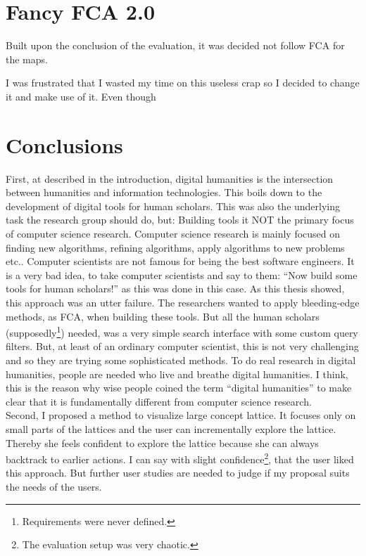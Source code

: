 \documentclass[11pt]{report}
\begin{document}
\chapter{Fancy FCA 2.0}
\label{Fancy 2.0}

Built upon the conclusion of the evaluation, it was decided not follow FCA for the maps. 

I was frustrated that I wasted my time on this useless crap so I decided to change it and make use of it. Even though

\chapter{Conclusions}
\label{Conclusions}

First, at described in the introduction, digital humanities is the intersection between humanities and information technologies. This boils down to the development of digital tools for human scholars. This was also the underlying task the research group should do, but: Building tools it NOT the primary focus of computer science research. Computer science research is mainly focused on finding new algorithms, refining algorithms, apply algorithms to new problems etc.. Computer scientists are not famous for being the best software engineers. It is a very bad idea, to take computer scientists and say to them: ``Now build some tools for human scholars!'' as this was done in this case. As this thesis showed, this approach was an utter failure. The researchers wanted to apply bleeding-edge methods, as FCA, when building these tools. But all the human scholars (supposedly\footnote{Requirements were never defined.}) needed, was a very simple search interface with some custom query filters. But, at least of an ordinary computer scientist, this is not very challenging and so they are trying some sophisticated methods. To do real research in digital humanities, people are needed who live and breathe digital humanities. I think, this is the reason why wise people coined the term ``digital humanities'' to make clear that it is fundamentally different from computer science research. \\

Second, I proposed a method to visualize large concept lattice. It focuses only on small parts of the lattices and the user can incrementally explore the lattice. Thereby she feels confident to explore the lattice because she can always backtrack to earlier actions. I can say with slight confidence\footnote{The evaluation setup was very chaotic.}, that the user liked this approach. But further user studies are needed to judge if my proposal suits the needs of the users. \\
\end{document}
